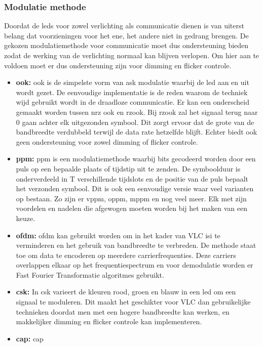 		\subsubsection{Modulatie methode}
		Doordat de \glspl{led} voor zowel verlichting als communicatie dienen is van uiterst belang dat voorzieningen voor het ene, het andere niet in gedrang brengen. De gekozen modulatiemethode voor communicatie moet dus ondersteuning bieden zodat de werking van de verlichting normaal kan blijven verlopen. Om hier aan te voldoen moet er dus ondersteuning zijn voor dimming en flicker controle.
			\begin{itemize}
				\item \textbf{\acrfull{ook}:} \gls{ook} is de simpelste vorm van \acrfull{ask} modulatie waarbij de \gls{led} aan en uit wordt gezet. De eenvoudige implementatie is de reden waarom de techniek wijd gebruikt wordt in de draadloze communicatie. Er kan een onderscheid gemaakt worden tussen \acrfull{nrz} \gls{ook} en \acrfull{rz}\gls{ook}. Bij \gls{rz}\gls{ook} zal het signaal terug naar 0 gaan achter elk uitgezonden symbool. Dit zorgt ervoor dat de grote van de bandbreedte verdubbeld terwijl de data rate hetzelfde blijft. Echter biedt \gls{ook} geen ondersteuning voor zowel dimming of flicker controle.
				
				\item \textbf{\acrfull{ppm}:} \gls{ppm} is een modulatiemethode waarbij bits gecodeerd worden door een puls op een bepaalde plaats of tijdstip uit te zenden. De symboolduur is onderverdeeld in T verschillende tijdslots en de positie van de puls bepaalt het verzonden symbool. Dit is ook een eenvoudige versie waar veel varianten op bestaan. Zo zijn er \acrfull{vppm}, \acrfull{oppm}, \acrfull{mppm} en nog veel meer. Elk met zijn voordelen en nadelen die afgewogen moeten worden bij het maken van een keuze. 
				
				\item \textbf{\acrfull{ofdm}:} \gls{ofdm} kan gebruikt worden om in het kader van VLC \acrfull{isi} te verminderen en het gebruik van bandbreedte te verbreden. De methode staat toe om data te encoderen op meerdere carrierfrequenties. Deze carriers overlappen elkaar op het frequentiespectrum en voor demodulatie worden er Fast Fourier Transformatie algoritmes gebruikt.
				
				\item \textbf{\acrfull{csk}:} In \gls{csk} varieert de kleuren rood, groen en blauw in een \gls{led} om een signaal te moduleren. Dit maakt het geschikter voor VLC dan gebruikelijke technieken doordat men met een hogere bandbreedte kan werken, en makkelijker dimming en flicker controle kan implementeren.
				
				\item \textbf{\acrfull{cap}:} \gls{cap} 
			\end{itemize}
